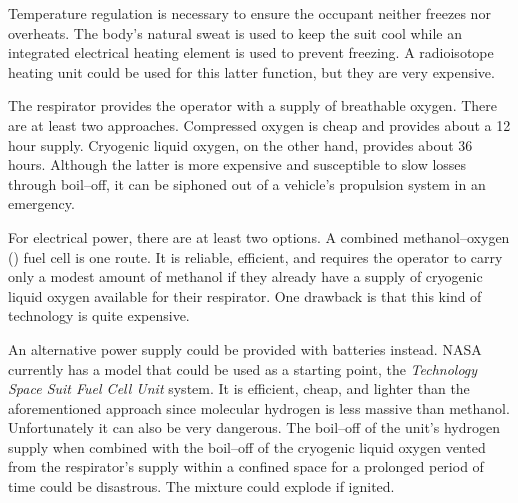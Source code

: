 Temperature regulation is necessary to ensure the occupant neither freezes nor overheats. The body's natural sweat is used to keep the suit cool while an integrated electrical heating element is used to prevent freezing. A radioisotope heating unit could be used for this latter function, but they are very expensive.

The respirator provides the operator with a supply of breathable oxygen. There are at least two approaches. Compressed oxygen is cheap and provides about a 12 hour supply. Cryogenic liquid oxygen, on the other hand, provides about 36 hours. Although the latter is more expensive and susceptible to slow losses through boil--off, it can be siphoned out of a vehicle's propulsion system in an emergency.

For electrical power, there are at least two options. A combined methanol--oxygen () fuel cell is one route. It is reliable, efficient, and requires the operator to carry only a modest amount of methanol if they already have a supply of cryogenic liquid oxygen available for their respirator. One drawback is that this kind of technology is quite expensive.

An alternative power supply could be provided with batteries instead. NASA currently has a model that could be used as a starting point, the {\it {} Technology Space Suit Fuel Cell Unit} system. It is efficient, cheap, and lighter than the aforementioned approach since molecular hydrogen is less massive than methanol. Unfortunately it can also be very dangerous. The boil--off of the unit's hydrogen supply when combined with the boil--off of the cryogenic liquid oxygen vented from the respirator's supply within a confined space for a prolonged period of time could be disastrous. The mixture could explode if ignited.

